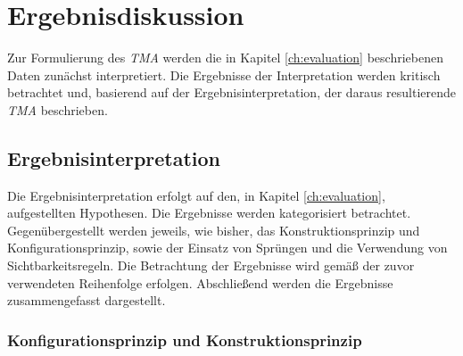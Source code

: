 \chapter{Ergebnisdiskussion}
\label{ch:Results}
Zur Formulierung des \emph{TMA} werden die in Kapitel \ref{ch:evaluation} beschriebenen Daten zunächst interpretiert. Die Ergebnisse der Interpretation werden kritisch betrachtet und, basierend auf der Ergebnisinterpretation, der daraus resultierende \emph{TMA} beschrieben. 


\section{Ergebnisinterpretation}
Die Ergebnisinterpretation erfolgt auf den, in Kapitel \ref{ch:evaluation}, aufgestellten Hypothesen. Die Ergebnisse werden kategorisiert betrachtet. Gegenübergestellt werden jeweils, wie bisher, das Konstruktionsprinzip und Konfigurationsprinzip, sowie der Einsatz von Sprüngen und die Verwendung von Sichtbarkeitsregeln. Die Betrachtung der Ergebnisse wird gemäß der zuvor verwendeten Reihenfolge erfolgen. Abschließend werden die Ergebnisse zusammengefasst dargestellt.


\subsection{Konfigurationsprinzip und Konstruktionsprinzip}



